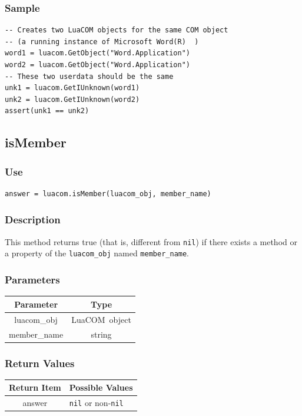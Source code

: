\documentclass[11pt,a4paper,english]{report}
\newcommand{\ident}[1]{\mbox{\texttt{#1}}}
\newcommand{\techname}[1]{\mbox{#1}}
\newcommand{\luacom}{\techname{LuaCOM}}
\begin{document}
\subsubsection*{Sample}

\begin{verbatim}
-- Creates two LuaCOM objects for the same COM object
-- (a running instance of Microsoft Word(R)  )
word1 = luacom.GetObject("Word.Application")
word2 = luacom.GetObject("Word.Application")
-- These two userdata should be the same
unk1 = luacom.GetIUnknown(word1)
unk2 = luacom.GetIUnknown(word2)
assert(unk1 == unk2)
\end{verbatim}

\subsection*{isMember}

\subsubsection*{Use}

\begin{verbatim}
answer = luacom.isMember(luacom_obj, member_name)
\end{verbatim}

\subsubsection*{Description}
This method returns true (that is, different from \ident{nil}) if
there exists a method or a property of the \ident{luacom\_obj} named
\ident{member\_name}.

\subsubsection*{Parameters}

\begin{tabular}{|c|c|}
\hline
\bf Parameter & \bf Type  \\ \hline \hline
luacom\_obj & \luacom\ object  \\ \hline
member\_name & string \\ \hline
\end{tabular}

\subsubsection*{Return Values}

\begin{tabular}{|c|p{4cm}|}
\hline
\bf Return Item & \bf Possible Values \\ \hline \hline
answer  & \ident{nil} or non-\ident{nil} \\ \hline
\end{tabular}
\end{document}
